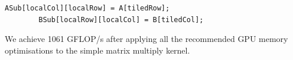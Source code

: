 \documentclass[review=false, sigchi]{acmart}
\begin{document}
	\begin{lstlisting}[firstnumber=20]
		ASub[localCol][localRow] = A[tiledRow];
		BSub[localRow][localCol] = B[tiledCol];
	\end{lstlisting}
	
	We achieve 1061 GFLOP/s after applying all the recommended GPU memory optimisations to the simple matrix multiply kernel.
	

\end{document}
